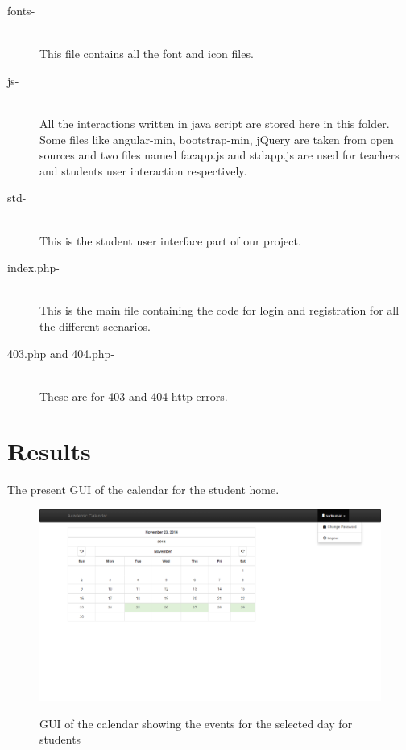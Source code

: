 \documentclass[a4paper, 12pt]{article}
\begin{document}
\begin{description}
\item[fonts-] \hfill \\
This file contains all the font and icon files.

\item[js-] \hfill \\
All the interactions written in java script are stored here in this folder. Some files like angular-min, bootstrap-min, jQuery are taken from open sources and two files named facapp.js and stdapp.js are used for teachers and students user interaction respectively.

\item[std-] \hfill \\
This is the student user interface part of our project.


\item[index.php-] \hfill \\
This is the main file containing the code for login and registration for all the different scenarios.


\item[403.php and 404.php-] \hfill \\
These are for 403 and 404 http errors.

\end{description}

\newpage
\section{Results}

The present GUI of the calendar for the student home.

\begin{figure}[H]
	\caption{GUI of the calendar showing the events for the selected day for students}
	\vspace{.5cm}
	\includegraphics[width=0.95\columnwidth]{student_home2}
	\label{fig:figure1}
\end{figure}
\end{document}
